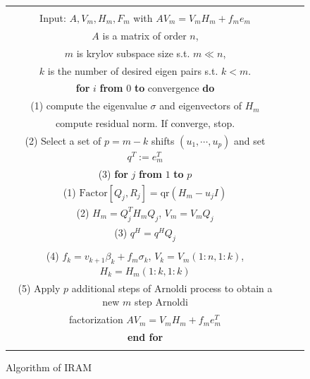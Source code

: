 \documentclass[graybox]{svmult}
\begin{document}
\begin{figure}[t]
\begin{tabular}[t]{|ccc|}\hline
\hspace*{3mm}&
\begin{minipage}[c]{0.9\hsize}
~\\
Input: $A, V_m, H_m, F_m$ with $A V_m = V_m H_m+f_m e_m$\\
\hspace*{1.2em}$A$ is a matrix of order $n$, \\
\hspace*{1.2em}$m$ is krylov subspace size s.t. $m\ll n$,\\
\hspace*{1.2em}$k$ is the number of desired eigen pairs s.t. $k<m$.\\
{\bf for} $i$ {\bf from} $0$ {\bf to} convergence {\bf do}\\
\hspace*{1.2em}(1) compute the eigenvalue $\sigma$ and eigenvectors of $H_m$\\
\hspace*{1.2em}compute residual norm. If converge, stop.\\
\hspace*{1.2em}(2) Select a set of $p=m-k$ shifts $(u_1,\cdots,u_p)$ and set $q^T:=e_m^T$\\
\hspace*{1.2em}(3) {\bf for} $j$ {\bf from } $1$ {\bf to} $p$\\
\hspace*{1.2em}\hspace*{1.2em} (1)  $\mbox{Factor}[Q_j,R_j] = \mbox{qr}(H_m-u_jI)$\\
\hspace*{1.2em}\hspace*{1.2em} (2) $H_m = Q_j^T H_m Q_j$, $V_m=V_mQ_j$\\
\hspace*{1.2em}\hspace*{1.2em} (3) $q^H=q^H Q_j$\\
\hspace*{1.2em}{\bf end for}\\
\hspace*{1.2em}(4) $f_k = v_{k+1}\beta_k + f_m \sigma_k$, $V_k=V_m(1:n, 1:k)$, $H_k=H_m(1:k,1:k)$\\
\hspace*{1.2em}(5) Apply $p$ additional steps of Arnoldi process to obtain a new $m$ step Arnoldi \\
\hspace*{1.2em}factorization $AV_m = V_m H_m +f_m e_m^T$\\
{\bf end for}\\
\end{minipage}
&\hspace*{3mm}
\\\hline
\end{tabular}
\caption{Algorithm of IRAM}
\label{fig:iram-algorithm}
\end{figure}
\end{document}
